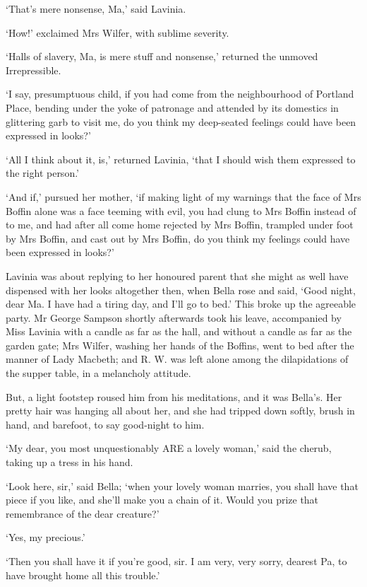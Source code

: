 ‘That’s mere nonsense, Ma,’ said Lavinia.

‘How!’ exclaimed Mrs Wilfer, with sublime severity.

‘Halls of slavery, Ma, is mere stuff and nonsense,’ returned the unmoved
Irrepressible.

‘I say, presumptuous child, if you had come from the neighbourhood of
Portland Place, bending under the yoke of patronage and attended by its
domestics in glittering garb to visit me, do you think my deep-seated
feelings could have been expressed in looks?’

‘All I think about it, is,’ returned Lavinia, ‘that I should wish them
expressed to the right person.’

‘And if,’ pursued her mother, ‘if making light of my warnings that the
face of Mrs Boffin alone was a face teeming with evil, you had clung to
Mrs Boffin instead of to me, and had after all come home rejected by Mrs
Boffin, trampled under foot by Mrs Boffin, and cast out by Mrs Boffin,
do you think my feelings could have been expressed in looks?’

Lavinia was about replying to her honoured parent that she might as well
have dispensed with her looks altogether then, when Bella rose and said,
‘Good night, dear Ma. I have had a tiring day, and I’ll go to bed.’ This
broke up the agreeable party. Mr George Sampson shortly afterwards took
his leave, accompanied by Miss Lavinia with a candle as far as the hall,
and without a candle as far as the garden gate; Mrs Wilfer, washing her
hands of the Boffins, went to bed after the manner of Lady Macbeth; and
R. W. was left alone among the dilapidations of the supper table, in a
melancholy attitude.

But, a light footstep roused him from his meditations, and it was
Bella’s. Her pretty hair was hanging all about her, and she had tripped
down softly, brush in hand, and barefoot, to say good-night to him.

‘My dear, you most unquestionably ARE a lovely woman,’ said the cherub,
taking up a tress in his hand.

‘Look here, sir,’ said Bella; ‘when your lovely woman marries, you shall
have that piece if you like, and she’ll make you a chain of it. Would
you prize that remembrance of the dear creature?’

‘Yes, my precious.’

‘Then you shall have it if you’re good, sir. I am very, very sorry,
dearest Pa, to have brought home all this trouble.’

